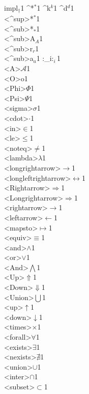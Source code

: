 {{\\impl}{{${}_\dagger$}}1
{^*}{{$^*$}}1
{^k}{{$^k$}}1
{^d}{{$^d$}}1
{\\<^sup>*}{{$^*$}}1
{\\<^sub>*}{{$_*$}}1
{\\<^sub>A}{{$_A$}}1
{\\<^sub>r}{{$_r$}}1
{\\<^sub>a}{{$_a$}}1
{:_i}{{$:_i$}}1
{\\<A>}{{$\mathcal{A}$}}1
{\\<O>}{{\sf o}}1
{\\<Phi>}{{$\Phi$}}1
{\\<Psi>}{{$\Psi$}}1
{\\<sigma>}{{$\sigma$}}1
{\\<cdot>}{{$\cdot$}}1
{\\<in>}{{$\in$}}1
{\\<le>}{{$\le$}}1
{\\<noteq>}{{$\ne$}}1
{\\<lambda>}{{$\lambda$}}1
{\\<longrightarrow>}{{$\longrightarrow$}}1
{\\<longleftrightarrow>}{{$\longleftrightarrow$}}1
{\\<Rightarrow>}{{$\Rightarrow$}}1
{\\<Longrightarrow>}{{$\Longrightarrow$}}1
{\\<rightarrow>}{{$\rightarrow$}}1
{\\<leftarrow>}{{$\leftarrow$}}1
{\\<mapsto>}{{$\mapsto$}}1
{\\<equiv>}{{$\equiv$}}1
{\\<and>}{{$\wedge$}}1
{\\<or>}{{$\vee$}}1
{\\<And>}{{$\bigwedge$}}1
{\\<Up>}{{$\Uparrow$}}1
{\\<Down>}{{$\Downarrow$}}1
{\\<Union>}{{$\bigcup$}}1
{\\<up>}{{$\uparrow$}}1
{\\<down>}{{$\downarrow$}}1
{\\<times>}{{$\times$}}1
{\\<forall>}{{$\forall$}}1
{\\<exists>}{{$\exists$}}1
{\\<nexists>}{{$\nexists$}}1
{\\<union>}{{$\cup$}}1
{\\<inter>}{{$\cap$}}1
{\\<subset>}{{$\subset$}}1
}

